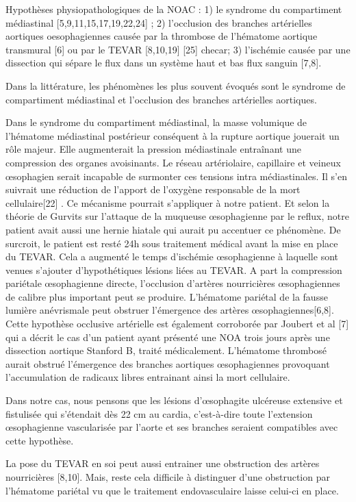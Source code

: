 \documentclass[./tfe.tex]{subfiles}
\begin{document}
Hypothèses physiopathologiques de la NOAC :
1) le syndrome du compartiment médiastinal [5,9,11,15,17,19,22,24] ;
2) l’occlusion des branches artérielles aortiques oesophagiennes causée par la thrombose de l'hématome aortique transmural [6] ou par le TEVAR [8,10,19] [25] checar;
3) l’ischémie causée par une dissection qui sépare le flux dans un système haut et bas flux sanguin [7,8].

Dans la littérature, les phénomènes les plus souvent évoqués sont le syndrome de compartiment médiastinal et l’occlusion des branches artérielles aortiques.

Dans le syndrome du compartiment médiastinal, la masse volumique de l'hématome médiastinal postérieur conséquent à la rupture aortique jouerait un rôle majeur. Elle augmenterait la pression médiastinale entraînant une compression des organes avoisinants. Le réseau artériolaire, capillaire et veineux œsophagien serait incapable de surmonter ces tensions intra médiastinales. Il s’en suivrait une réduction de l’apport de l’oxygène responsable de la mort cellulaire[22] . Ce mécanisme pourrait s’appliquer à notre patient. Et selon la théorie de Gurvits sur l’attaque de la muqueuse œsophagienne par le reflux, notre patient avait aussi une hernie hiatale qui aurait pu accentuer ce phénomène.
De surcroit, le patient est resté 24h sous traitement médical avant la mise en place du TEVAR. Cela a augmenté le temps d’ischémie œsophagienne à laquelle sont venues s’ajouter d’hypothétiques lésions liées au TEVAR.
A part la compression pariétale œsophagienne directe, l’occlusion d’artères nourricières œsophagiennes de calibre plus important peut se produire. L’hématome pariétal de la fausse lumière anévrismale peut obstruer l’émergence des artères œsophagiennes[6,8]. Cette hypothèse occlusive artérielle est également corroborée par Joubert et al [7] qui a décrit le cas d'un patient ayant présenté une NOA trois jours après une dissection aortique Stanford B, traité médicalement. L'hématome thrombosé aurait obstrué l’émergence des branches aortiques œsophagiennes provoquant l'accumulation de radicaux libres entrainant ainsi la mort cellulaire.

Dans notre cas, nous pensons que les lésions d’œsophagite ulcéreuse extensive et fistulisée qui s'étendait dès 22 cm au cardia, c'est-à-dire toute l'extension œsophagienne vascularisée par l'aorte et ses branches seraient compatibles avec cette hypothèse.

La pose du TEVAR en soi peut aussi entrainer une obstruction des artères nourricières [8,10]. Mais, reste cela difficile à distinguer d’une obstruction par l’hématome pariétal vu que le traitement endovasculaire laisse celui-ci en place.
\end{document}
